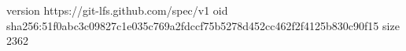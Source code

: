version https://git-lfs.github.com/spec/v1
oid sha256:51f0abc3c09827c1e035c769a2fdccf75b5278d452cc462f2f4125b830c90f15
size 2362
